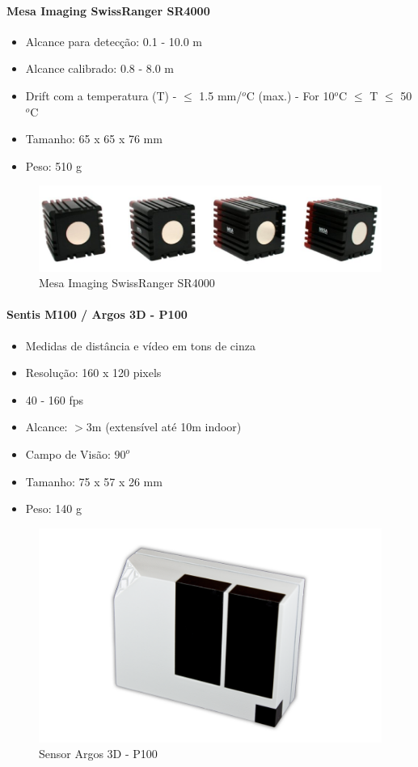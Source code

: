 \paragraph{Mesa Imaging SwissRanger SR4000}


\begin{itemize}
  \item Alcance para detecção: 0.1 - 10.0 m
  \item Alcance calibrado: 0.8 - 8.0 m
  \item Drift com a temperatura (T) - $\leq$ 1.5 mm/$^o$C (max.) - For 10$^o$C
  $\leq$ T $\leq$ 50$^o$C
  \item Tamanho: 65 x 65 x 76 mm
  \item Peso: 510 g
\end{itemize}

\begin{figure}[h!]
   \centering
   \includegraphics[width=\columnwidth]{detail/figs/3dsensors/mesa2}
   \caption{Mesa Imaging SwissRanger SR4000}
   \label{fig::mesa}
\end{figure}

\paragraph{Sentis M100 / Argos 3D - P100}

\begin{itemize}
  \item Medidas de distância e vídeo em tons de cinza
  \item Resolução: 160 x 120 pixels
  \item 40 - 160 fps
  \item Alcance: $>$3m  (extensível até 10m indoor)
  \item Campo de Visão: $90^o$
  \item Tamanho: 75 x 57 x 26 mm
  \item Peso:  	140 g  
\end{itemize}

\begin{figure}[h!]
   \centering
   \includegraphics[width=0.6\columnwidth]{detail/figs/3dsensors/argos3dp100}
   \caption{Sensor Argos 3D - P100}
   \label{fig::forecast}
\end{figure}


